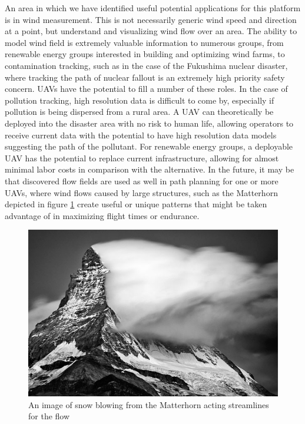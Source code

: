 \documentclass[12pt]{report}
\begin{document}
An area in which we have identified useful potential applications for this platform is in wind measurement. This is not necessarily generic wind speed and direction at a point, but understand and visualizing wind flow over an area. The ability to model wind field is extremely valuable information to numerous groups, from renewable energy groups interested in building and optimizing wind farms, to contamination tracking, such as in the case of the Fukushima nuclear disaster, where tracking the path of nuclear fallout is an extremely high priority safety concern. UAVs have the potential to fill a number of these roles. In the case of pollution tracking, high resolution data is difficult to come by, especially if pollution is being dispersed from a rural area. A UAV can theoretically be deployed into the disaster area with no risk to human life, allowing operators to receive current data with the potential to have high resolution data models suggesting the path of the pollutant. For renewable energy groups, a deployable UAV has the potential to replace current infrastructure, allowing for almost minimal labor costs in comparison with the alternative. In the future, it may be that discovered flow fields are used as well in path planning for one or more UAVs, where wind flows caused by large structures, such as the Matterhorn depicted in figure \ref{fig:Matterhorn_Wind} create useful or unique patterns that might be taken advantage of in maximizing flight times or endurance.
\begin{figure}[!ht]
	\centering
	\includegraphics[scale=0.45]{Matterhorn_Wind.jpg}
	\caption{An image of snow blowing from the Matterhorn acting streamlines for the flow \cite{Saljic12}}
	\label{fig:Matterhorn_Wind}
\end{figure}
\end{document}
